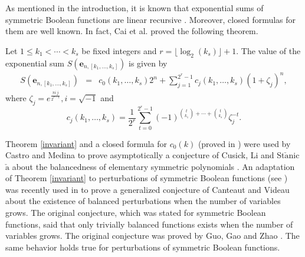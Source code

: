 As mentioned in the introduction, it is known that exponential sums of symmetric Boolean functions are linear recursive \cite{cai, cm1}.  Moreover, closed formulas for them are well known.  In fact, Cai et al. \cite{cai} proved the following theorem.
\begin{theorem}
\label{invariant}
Let $1\leq k_1< \cdots <k_s$ be fixed integers and $r=\lfloor \log_2(k_s) \rfloor+1$. The value of the exponential sum $S(\boldsymbol{e}_{n,[k_1,\ldots,k_s]})$ is given by
\begin{eqnarray}
\label{genvalue}\nonumber
S(\boldsymbol{e}_{n,[k_1,\ldots,k_s]})&=& c_0(k_1,\ldots,k_s) 2^n + \sum_{j=1}^{2^r-1} c_j(k_1,\ldots,k_s) (1+\zeta_j)^n,
\end{eqnarray}
where $\zeta_j = e^{\frac{\pi i\, j}{2^{r-1}}}, i=\sqrt{-1}$ and 
\begin{equation}
\label{coeffs}
c_j(k_1,\ldots,k_s)=\frac{1}{2^r}\sum_{t=0}^{2^r-1}(-1)^{\binom{t}{k_1}+\cdots+\binom{t}{k_s}}\zeta_j^{-t}.
\end{equation}
\end{theorem}
Theorem \ref{invariant} and a closed formula for $c_0(k)$ (proved in \cite{cm1}) were used by Castro and Medina \cite{cm1} to prove asymptotically a conjecture of Cusick, Li and 
St$\check{\mbox{a}}$nic$\check{\mbox{a}}$ about the balancedness of elementary symmetric polynomials \cite{cusick2}.  An adaptation of Theorem \ref{invariant} to perturbations of symmetric Boolean functions
(see \cite{cm2}) was recently used in \cite{cgm3} to prove a generalized conjecture of Canteaut and Videau \cite{canteaut} about the existence of balanced perturbations when the number of variables grows.  The original conjecture, which was stated for symmetric Boolean functions, said that only trivially balanced functions exists when the number of variables grows.  The original conjecture was proved by Guo, Gao and Zhao \cite{ggz}.  The same behavior holds true for perturbations of symmetric Boolean functions.

